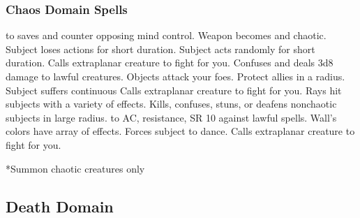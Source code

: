 \subsubsection{Chaos Domain Spells}
\begin{spelllist}
  to saves and counter opposing mind control.
 Weapon becomes  and chaotic.
 Subject loses actions for short duration.
 Subject acts randomly for short duration.
 Calls extraplanar creature to fight for you.
 Confuses and deals 3d8 damage to lawful creatures.
 Objects attack your foes.
 Protect allies in a \areamed radius.
 Subject suffers continuous 
 Calls extraplanar creature to fight for you.
 Rays hit subjects with a variety of effects.
 Kills, confuses, stuns, or deafens nonchaotic subjects in large radius.
\F {} to AC,  resistance, SR 10 against lawful spells.
 Wall's colors have array of effects.
 Forces subject to dance.
 Calls extraplanar creature to fight for you.
\end{spelllist}
*Summon chaotic creatures only

\subsection{Death Domain}
